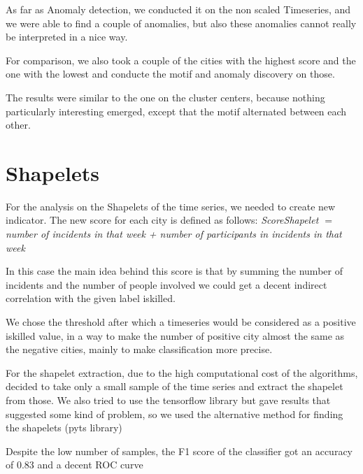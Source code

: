 As far as Anomaly detection, we conducted it on the non scaled Timeseries, and we were able to find a couple of anomalies, but also these anomalies cannot really be interpreted in a nice way.

For comparison, we also took a couple of the cities with the highest score and the one with the lowest and conducte the motif and anomaly discovery on those.

The results were similar to the one on the cluster centers, because nothing particularly interesting emerged, except that the motif alternated between each other.



\section{Shapelets}

For the analysis on the Shapelets of the time series, we needed to create  new indicator.
The new score for each city is defined as follows:
\textit{Score\textunderscore Shapelet $=$ number of incidents in that week + number of participants in incidents in that week}

In this case the main idea behind this score is that by summing the number of incidents and the number of people involved we could get a decent indirect correlation with the given label is\textunderscore killed.

We chose the threshold after which a timeseries would be considered as a positive is\textunderscore killed value, in a way to make the number of positive city almost the same as the negative cities, mainly to make classification more precise.

For the shapelet extraction, due to the high computational cost of the algorithms, decided to take only a small sample of the time series and extract the shapelet from those.
We also tried to use the tensorflow library but gave results that suggested some kind of problem, so we used the alternative method for finding the shapelets (pyts library)

Despite the low number of samples, the F1 score of the classifier got an accuracy of 0.83 and a decent ROC curve




















